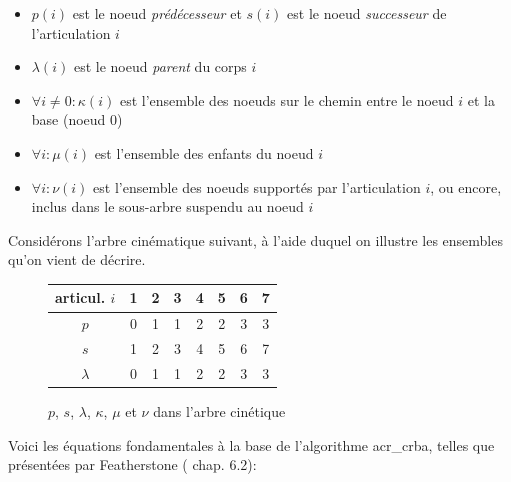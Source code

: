 \documentclass{report}
\begin{document}
\begin{itemize}
\item $p(i)$ est le noeud \emph{prédécesseur} et $s(i)$ est le noeud \emph{successeur} de l'articulation $i$
\item $\lambda(i)$ est le noeud \emph{parent} du corps $i$
\item $\forall i \neq 0: \kappa(i)$ est l'ensemble des noeuds sur le chemin entre le noeud $i$ et la base (noeud $0$)
\item $\forall i: \mu (i)$  est l'ensemble des enfants du noeud $i$
\item $\forall i: \nu (i)$  est l'ensemble des noeuds supportés par l'articulation $i$, ou encore, inclus dans le sous-arbre suspendu au noeud $i$
\end{itemize}

Considérons l'arbre cinématique suivant, à l'aide duquel on illustre les ensembles qu'on vient de décrire.\\

\begin{figure}[H]
{%
  \begin{center}
  	\end{center}
}
{%
  \begin{center}
  	\begin{tabular}{|c|c|c|c|c|c|c|c|}
  	\hline 
	articul. $i$ & 1 & 2 & 3 & 4 & 5 & 6 & 7 \\ 
  	\hline 
  	$p$ & 0 & 1 & 1 & 2 & 2 & 3 & 3 \\ 
  	\hline 
  	$s$ & 1 & 2 & 3 & 4 & 5 & 6 & 7 \\ 
  	\hline 
  	$\lambda$ & 0 & 1 & 1 & 2 & 2 & 3 & 3 \\ 
  	\hline 
  	\end{tabular} 
  \end{center}
}{}
\caption{$p$, $s$, $\lambda$, $\kappa$, $\mu$ et $\nu$ dans l'arbre cinétique}
\label{fig_chdaArbreK_p_s_k_mu_nu}
\end{figure}

Voici les équations fondamentales à la base de l'algorithme \gls{acr_crba}, telles que présentées par Featherstone (\cite{bib_featherstone} chap. 6.2):

{%
}
{%
}{}
\end{document}
